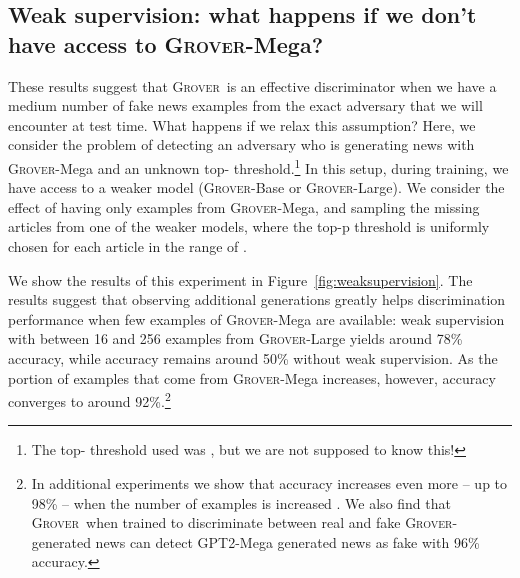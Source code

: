 \documentclass{article}
\newcommand{\modelname}{{\textsc{Grover}}}
\newcommand{\modelnamefordisc}{{\textsc{Grover}}}
\begin{document}
\subsection{Weak supervision: what happens if we don't have access to \modelname-Mega?}
These results suggest that \modelnamefordisc~is an effective discriminator when we have a medium number of fake news examples from the exact adversary that we will encounter at test time. What happens if we relax this assumption? Here, we consider the problem of detecting an adversary who is generating news with \modelname-Mega and an unknown top- threshold.\footnote{The top- threshold used was , but we are not supposed to know this!} In this setup, during training, we have access to a weaker model (\modelname-Base or \modelname-Large). We consider the effect of having only  examples from \modelname-Mega, and sampling the missing  articles from one of the weaker models, where the top-p threshold is uniformly chosen for each article in the range of . 

We show the results of this experiment in Figure~\ref{fig:weaksupervision}. The results suggest that observing additional generations greatly helps discrimination performance when few examples of \modelname-Mega are available: weak supervision with between 16 and 256 examples from \modelname-Large yields around 78\% accuracy, while accuracy remains around 50\% without weak supervision. As the portion of examples that come from \modelname-Mega increases, however, accuracy converges to around 92\%.\footnote{In additional experiments we show that accuracy increases even more -- up to 98\% -- when the number of examples is increased \citep{zellers2019blogpost}. We also find that \modelname~when trained to discriminate between real and fake \modelname-generated news can detect GPT2-Mega generated news as fake with 96\% accuracy.}

 
\end{document}
